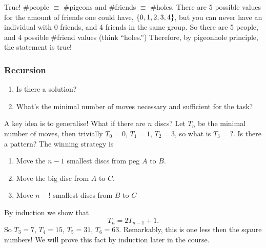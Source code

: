 \documentclass{report}
\begin{document}
\sol True! \#people $\equiv$ \#pigeons and \#friends $\equiv$ \#holes. There are 5 possible values for the amount of friends one could have, $\left\lbrace 0, 1, 2, 3, 4 \right\rbrace$, but you can never have an individual with 0 friends, and 4 friends in the same group. So there are 5 people, and 4 possible \#friend values (think ``holes.'') Therefore, by pigeonhole principle, the statement is true!


\subsubsection*{Recursion}
\begin{enumerate}
	\item Is there a solution?
	\item What's the minimal number of moves necessary and sufficient for the task?
\end{enumerate}
A key idea is to generalise! What if there are $n$ discs? Let $T_n$ be the minimal number of moves, then trivially $T_0 = 0$, $T_1 = 1$, $T_2 = 3$, so what is $T_3 = ?$. Is there a pattern? The winning strategy is
\begin{enumerate}
	\item Move the $n-1$ smallest discs from peg $A$ to $B$.
	\item Move the big disc from $A$ to $C$.
	\item Move $n-!$ smallest discs from $B$ to $C$
\end{enumerate}
By induction we show that
$$
	T_n = 2T_{n-1} + 1.
$$
So $T_3 = 7$, $T_4 = 15$, $T_5 = 31$, $T_6 = 63$. Remarkably, this is one less then the sqaure numbers! We will prove this fact by induction later in the course.

\newpage
\end{document}
